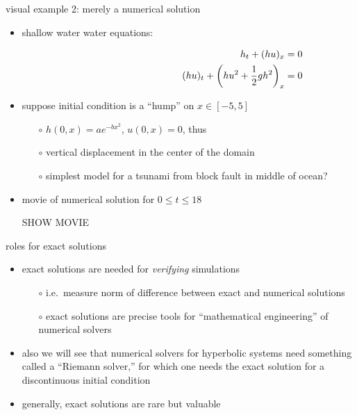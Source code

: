 \documentclass[10pt,hyperref,dvipsnames]{beamer}
\begin{document}
\begin{frame}{visual example 2: merely a numerical solution}

\begin{itemize}
\item shallow water water equations:

\vspace{-11.5mm}
\begin{align*}
\hspace{60mm} h_t + (hu)_x &= 0 \\
(hu)_t + \left(h u^2 + \frac{1}{2} g h^2\right)_x &= 0
\end{align*}
\item suppose initial condition is a ``hump'' on $x\in[-5,5]$
    \begin{itemize}
    \item[$\circ$] $h(0,x)=a e^{-bx^2}$, $u(0,x)=0$, thus
    \item[$\circ$] vertical displacement in the center of the domain
    \item[$\circ$] simplest model for a tsunami from block fault in middle of ocean?
    \end{itemize}
\item movie of numerical solution for $0 \le t \le 18$

\vspace{10mm}
\begin{center}
\alert{SHOW MOVIE}
\end{center}

\vspace{10mm}

\end{itemize}
\end{frame}


\begin{frame}{roles for exact solutions}

\begin{itemize}
\item exact solutions are needed for \emph{verifying} simulations
    \begin{itemize}
    \item[$\circ$] i.e.~measure norm of difference between exact and numerical solutions
    \item[$\circ$] exact solutions are precise tools for ``mathematical engineering'' of numerical solvers
    \end{itemize}
\item also we will see that numerical solvers for hyperbolic systems need something called a ``Riemann solver,'' for which one needs the exact solution for a discontinuous initial condition
\item generally, exact solutions are rare but valuable
\end{itemize}
\end{frame}
\end{document}
